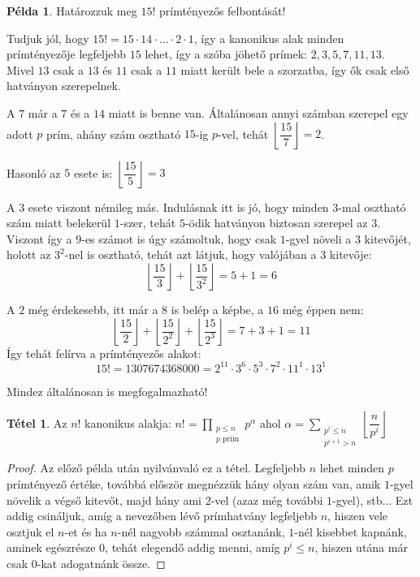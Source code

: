\documentclass[12pt]{book}
\theoremstyle{plain} %
\theoremstyle{definition} %
\newtheorem{pl}{Példa}[section]
\newtheorem{theo/}{Tétel}[section]
\newenvironment{theo}
  {\renewcommand{\qedsymbol}{$\clubsuit$}%
   \pushQED{\qed}\begin{theo/}}
  {\popQED\end{theo/}}
\theoremstyle{remark}
\renewcommand\qedsymbol{$\blacksquare$}
\numberwithin{equation}{section}  %
\begin{document}
	\begin{pl}
		Határozzuk meg $15!$ prímtényezős felbontását!
		
		Tudjuk jól, hogy $15! = 15\cdot 14\cdot \ldots \cdot 2\cdot 1$, így a kanonikus alak minden prímtényezője legfeljebb $15$ lehet, így a szóba jöhető prímek: $2, 3, 5, 7, 11, 13$. Mivel $13$ csak a $13$ és $11$ csak a $11$ miatt került bele a szorzatba, így ők csak első hatványon szerepelnek.
		
		A $7$ már a $7$ és a $14$ miatt is benne van. Általánosan annyi számban szerepel egy adott $p$ prím, ahány szám osztható $15$-ig $p$-vel, tehát $\left \lfloor \dfrac{15}{7} \right \rfloor = 2$.
		
		Hasonló az $5$ esete is: $\left \lfloor \dfrac{15}{5} \right \rfloor = 3$
		
		A $3$ esete viszont némileg más. Indulásnak itt is jó, hogy minden $3$-mal osztható szám miatt belekerül $1$-szer, tehát $5$-ödik hatványon biztosan szerepel az $3$. Viszont így a $9$-es számot is úgy számoltuk, hogy csak $1$-gyel növeli a $3$ kitevőjét, holott az $3^2$-nel is osztható, tehát azt látjuk, hogy valójában a $3$ kitevője:
		\[\left \lfloor \dfrac{15}{3} \right \rfloor + \left \lfloor \dfrac{15}{3^2} \right \rfloor  = 5 + 1 = 6 \]
		
		A $2$ még érdekesebb, itt már a $8$ is belép a képbe, a $16$ még éppen nem:
		\[\left \lfloor \dfrac{15}{2} \right \rfloor + \left \lfloor \dfrac{15}{2^2} \right \rfloor + \left \lfloor \dfrac{15}{2^3} \right \rfloor  = 7 + 3 + 1 = 11   \]
		Így tehát felírva a prímtényezős alakot:
		\[ 15! = 1307674368000 = 2^{11} \cdot 3^6 \cdot 5^3 \cdot 7^2 \cdot 11^1 \cdot 13^1  \]
	\end{pl}

	Mindez általánosan is megfogalmazható!

	\begin{theo}\label{faktkan}
		Az $n!$ kanonikus alakja: $ \displaystyle n! = \prod\limits_{\substack{p\leq n \\  p\text{ prím}}} p^\alpha$ ahol $\displaystyle \alpha = \sum\limits_{\substack{p^i\leq n \\ p^{i+1}>n}} \left \lfloor \dfrac{n}{p^i} \right \rfloor$
	\end{theo}

	\begin{proof}
		Az előző példa után nyilvánvaló ez a tétel. Legfeljebb $n$ lehet minden $p$ prímtényező értéke, továbbá először megnézzük hány olyan szám van, amik $1$-gyel növelik a végső kitevőt, majd hány ami $2$-vel (azaz még további $1$-gyel), stb... Ezt addig csináljuk, amíg a nevezőben lévő prímhatvány legfeljebb $n$, hiszen vele osztjuk el $n$-et és ha $n$-nél nagyobb számmal osztanánk, $1$-nél kisebbet kapnánk, aminek egészrésze $0$, tehát elegendő addig menni, amíg $p^i\leq n$, hiszen utána már csak $0$-kat adogatnánk össze.
	\end{proof}
\end{document}
